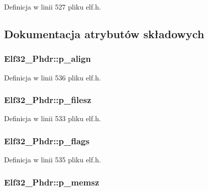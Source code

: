 Definicja w linii 527 pliku elf.\-h.



\subsection{Dokumentacja atrybutów składowych}
\hypertarget{struct_elf32___phdr_afd09d9e4297b13fc94fd57d09f2a9f70}{
\subsubsection[{p\-\_\-align}]{ Elf32\-\_\-\-Phdr\-::p\-\_\-align}}\label{struct_elf32___phdr_afd09d9e4297b13fc94fd57d09f2a9f70}


Definicja w linii 536 pliku elf.\-h.

\hypertarget{struct_elf32___phdr_ac9151f2e11001284bf1c7d2d2659555c}{
\subsubsection[{p\-\_\-filesz}]{ Elf32\-\_\-\-Phdr\-::p\-\_\-filesz}}\label{struct_elf32___phdr_ac9151f2e11001284bf1c7d2d2659555c}


Definicja w linii 533 pliku elf.\-h.

\hypertarget{struct_elf32___phdr_a35c457e6828894b7b275730593802050}{
\subsubsection[{p\-\_\-flags}]{ Elf32\-\_\-\-Phdr\-::p\-\_\-flags}}\label{struct_elf32___phdr_a35c457e6828894b7b275730593802050}


Definicja w linii 535 pliku elf.\-h.

\hypertarget{struct_elf32___phdr_ada1cdd3d6ccb79a17bed0e3c21379c84}{
\subsubsection[{p\-\_\-memsz}]{ Elf32\-\_\-\-Phdr\-::p\-\_\-memsz}}\label{struct_elf32___phdr_ada1cdd3d6ccb79a17bed0e3c21379c84}


